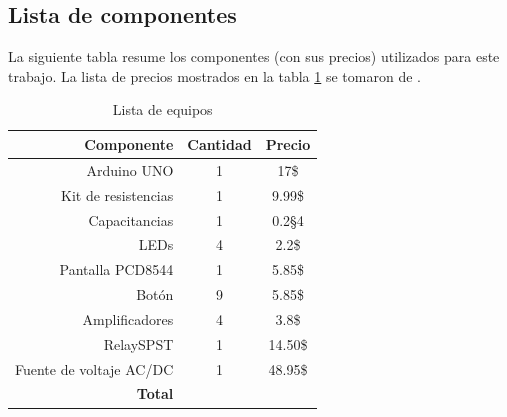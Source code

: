 \subsection*{Lista de componentes}
La siguiente tabla resume los componentes (con sus precios) utilizados para este trabajo. La lista de precios mostrados en la tabla \ref{table_2} se tomaron de \cite{web4}. %
\begin{table}[H]
\caption{Lista de equipos}
\label{table_2}
\begin{center}
\begin{tabular}{r|cc}
\hline
\textbf{Componente}&\textbf{Cantidad}&\textbf{Precio}\\
 \hline
Arduino UNO&1   &17\$ \\ \hline 
Kit de resistencias &1   &9.99\$ \\ \hline 
Capacitancias&1   &0.2\S4 \\ \hline 
LEDs&4   &2.2\$ \\ \hline 
Pantalla PCD8544&1   &5.85\$ \\ \hline 
Botón&9   &5.85\$ \\ \hline 
Amplificadores&4   &3.8\$ \\ \hline 
RelaySPST & 1 & 14.50\$ \\ \hline 
Fuente de voltaje AC/DC& 1&48.95\$\\ \hline 

 \textbf{Total}& &  \\
 \hline
\end{tabular}
\end{center}
\end{table}

